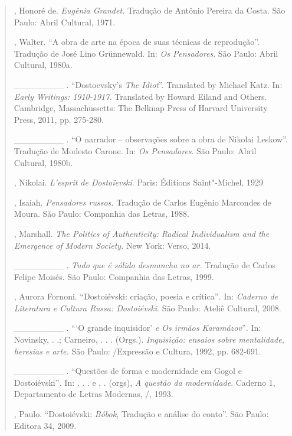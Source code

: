 {\begin{quote}
\begin{Parskip}
, Honoré de. \emph{Eugênia Grandet.} Tradução de Antônio Pereira
da Costa. São Paulo: Abril Cultural, 1971.

, Walter. ``A obra de arte na época de suas técnicas de
reprodução''. Tradução de José Lino Grünnewald. In: \emph{Os
Pensadores}. São Paulo: Abril Cultural, 1980a.

\_\_\_\_\_\_\_\_ . ``Dostoevsky's \emph{The Idiot}''. Translated by
Michael Katz. In: \emph{Early Writings: 1910-1917.} Translated by Howard
Eiland and Others. Cambridge, Massachussetts: The Belknap Press of
Harvard University Press, 2011, pp. 275-280.

\_\_\_\_\_\_\_\_ . ``O narrador -- observações sobre a obra de Nikolai
Leskow''. Tradução de Modesto Carone. In: \emph{Os Pensadores}. São
Paulo: Abril Cultural, 1980b.

, Nikolai. \emph{L'esprit de Dostoïevski}. Paris: Éditions
Saint"-Michel, 1929

, Isaiah. \emph{Pensadores russos.} Tradução de Carlos Eugênio
Marcondes de Moura. São Paulo: Companhia das Letras, 1988.

, Marshall. \emph{The Politics of Authenticity: Radical
Individualism and the Emergence of Modern Society.} New York: Verso,
2014.

\_\_\_\_\_\_\_\_ . \emph{Tudo que é sólido desmancha no ar.} Tradução de
Carlos Felipe Moisés. São Paulo: Companhia das Letras, 1999.

, Aurora Fornoni. ``Dostoiévski: criação, poesia e
crítica''\emph{.} In: \emph{Caderno de Literatura e Cultura Russa:
Dostoiévski}. São Paulo: Ateliê Cultural, 2008.

\_\_\_\_\_\_\_\_ . ```O grande inquisidor' \emph{e Os irmãos
Karamázov}''\emph{.} In: Novinsky, . .; Carneiro, . . . (Orgs.).
\emph{Inquisição: ensaios sobre mentalidade, heresias e arte.} São
Paulo: /Expressão e Cultura, 1992, pp. 682-691.

\_\_\_\_\_\_\_\_ . ``Questões de forma e modernidade em Gogol e
Dostoiévski''\emph{.} In: , . . e , . (orgs), \emph{A
questão da modernidade}. Caderno 1, Departamento de Letras Modernas,
/, 1993.

, Paulo. ``Dostoiévski: \emph{Bóbok}, Tradução e análise do
conto''. São Paulo: Editora 34, 2009.


\end{Parskip}
\end{quote}}
